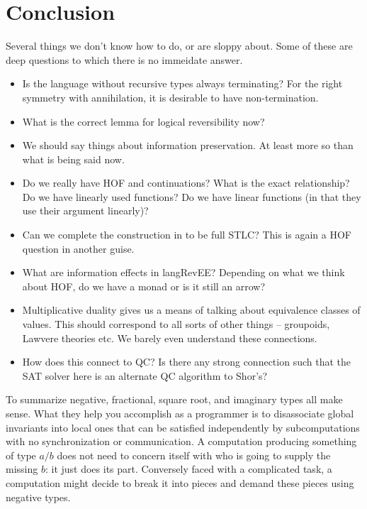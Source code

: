 \documentclass[preprint]{sigplanconf}
\begin{document}
\section{Conclusion}
\label{sec:conc}


Several things we don't know how to do, or are sloppy about. Some of
these are deep questions to which there is no immeidate answer.

\begin{itemize}

\item Is the language without recursive types always terminating? For
  the right symmetry with annihilation, it is desirable to have
  non-termination.

\item What is the correct lemma for logical reversibility now?

\item We should say things about information preservation. At least
  more so than what is being said now.

\item Do we really have HOF and continuations? What is the exact
  relationship? Do we have linearly used functions? Do we have linear
  functions (in that they use their argument linearly)?

\item Can we complete the construction in \cite{infeffects} to be full
  STLC? This is again a HOF question in another guise. 

\item What are information effects in {{langRevEE}}? Depending on what
  we think about HOF, do we have a monad or is it still an arrow?

\item Multiplicative duality gives us a means of talking about
  equivalence classes of values. This should correspond to all sorts
  of other things -- groupoids, Lawvere theories etc. We barely even
  understand these connections.

\item How does this connect to QC? Is there any strong connection such
  that the SAT solver here is an alternate QC algorithm to Shor's?

\end{itemize}


To summarize negative, fractional, square root, and imaginary types all make
sense. What they help you accomplish as a programmer is to disassociate
global invariants into local ones that can be satisfied independently by
subcomputations with no synchronization or communication. A computation
producing something of type $a/b$ does not need to concern itself with who is
going to supply the missing $b$: it just does its part. Conversely faced with
a complicated task, a computation might decide to break it into pieces and
demand these pieces using negative types. 
\end{document}
